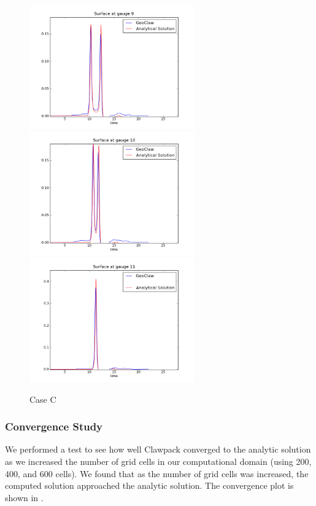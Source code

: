 \begin{figure}[ht]
\hfil\includegraphics[width=2.8in]{bp2/CaseC/gauge0009fig300.png}\hfil
\vskip 5pt
\hfil\includegraphics[width=2.8in]{bp2/CaseC/gauge0010fig300.png}\hfil
\hfil\includegraphics[width=2.8in]{bp2/CaseC/gauge0011fig300.png}\hfil
\caption{\label{fig:bp2C} Case C }
\end{figure}

\subsubsection{Convergence Study}
We performed a test to see how well Clawpack converged to the analytic
solution as we increased the number of grid cells in our computational
domain (using 200, 400, and 600 cells).  
We found that as the number of grid cells was increased,  the computed solution approached the analytic solution.  The convergence plot is shown in .

